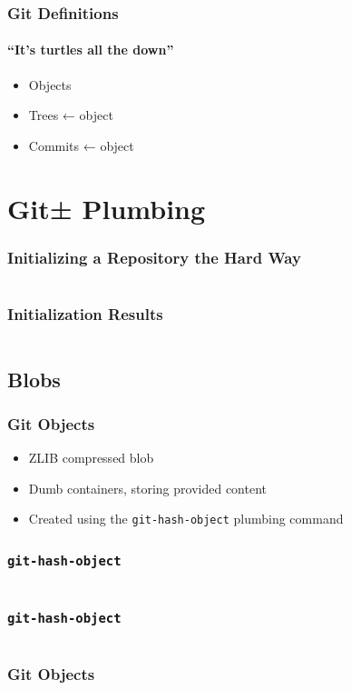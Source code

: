 \documentclass[]{beamer}
\begin{document}
\begin{frame}
\frametitle{Git Definitions}
\framesubtitle{``It's turtles all the down''}
\begin{itemize}
\item{Objects}
\item{Trees ← object}
\item{Commits ← object}
\end{itemize}
\end{frame}

\section{Git± Plumbing}

\begin{frame}[fragile]
\frametitle{Initializing a Repository the Hard Way}
\inputminted{bash}{code/1/1}
\end{frame}

\begin{frame}[fragile]
\frametitle{Initialization Results}
\inputminted{bash}{code/1/2}
\end{frame}

\subsection{Blobs}
\begin{frame}
\frametitle{Git Objects}
\begin{itemize}
\item{ZLIB compressed blob}
\item{Dumb containers, storing provided content}
\item{Created using the \texttt{git-hash-object} plumbing command}
\end{itemize}
\end{frame}

\begin{frame}[fragile]
\frametitle{\texttt{git-hash-object}}
\inputminted{bash}{code/1/3}
\end{frame}

\begin{frame}[fragile]
\frametitle{\texttt{git-hash-object}}
\inputminted{bash}{code/1/4}
\end{frame}

\begin{frame}
\frametitle{Git Objects}
\begin{figure}
\end{figure}
\end{frame}
\end{document}
